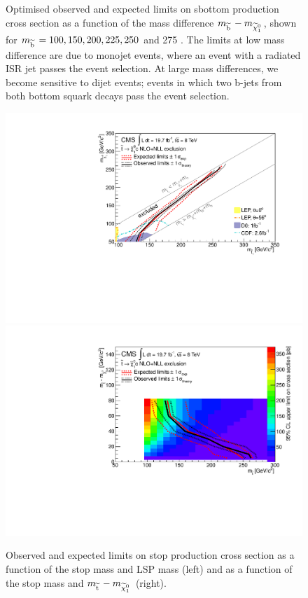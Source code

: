 \begin{figure}[!Hhtb]
\begin{center}
  \caption{Optimised observed and expected limits on sbottom production cross section as a function of the mass difference $m_{\widetilde{{\rm b}}\,} - m_{\widetilde{\chi}^{0}_{1}\,}$, shown for $m_{\widetilde{{\rm b}}\,} = 100, 150, 200, 225, 250$ and 275 \GeV. 
  The limits at low mass difference are due to monojet events, 
  where an event with a radiated ISR jet passes the event selection. 
  At large mass differences, we become sensitive to dijet events; events in which two b-jets from both bottom squark decays pass the event selection.}
  \label{fig:sbottom_limits}
  \end{center}
\end{figure}



\begin{figure}[!Hhtb]
  \begin{center}
  \includegraphics[scale=0.39]{Figures/sus13009/limits/limits_stopLSP.pdf}
  \includegraphics[scale=0.39]{Figures/sus13009/limits/limits_stopDM.pdf}
  \caption{ Observed and expected limits on stop production cross section as a function of the stop mass and LSP mass (left) and 
  as a function of the stop mass and $m_{\widetilde{{\rm t}}\,} - m_{\widetilde{\chi}^{0}_{1}\,}$ (right).}
  \label{fig:stop_limits_2D}
  \end{center}
\end{figure}


